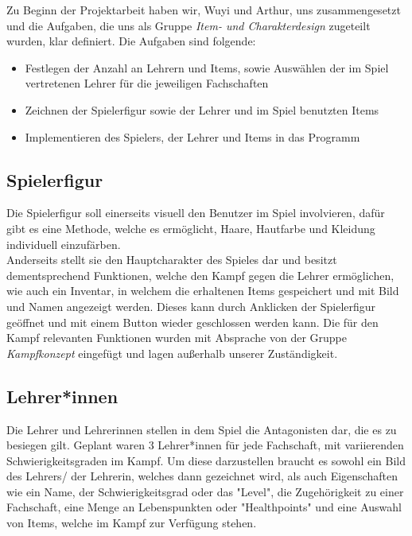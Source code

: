 Zu Beginn der Projektarbeit haben wir, Wuyi und Arthur, uns zusammengesetzt und die Aufgaben, die uns als Gruppe \emph{Item- und Charakterdesign} zugeteilt wurden, klar definiert. Die Aufgaben sind folgende:

\begin{itemize}
	\item Festlegen der Anzahl an Lehrern und Items, sowie Auswählen der im Spiel vertretenen Lehrer für die jeweiligen Fachschaften
	\item Zeichnen der Spielerfigur sowie der Lehrer und im Spiel benutzten Items
	\item Implementieren des Spielers, der Lehrer und Items in das Programm 
\end{itemize}

\subsection{Spielerfigur}
Die Spielerfigur soll einerseits visuell den Benutzer im Spiel involvieren, dafür gibt es eine Methode, welche es ermöglicht, Haare, Hautfarbe und Kleidung individuell einzufärben.\\ Anderseits stellt sie den Hauptcharakter des Spieles dar und besitzt dementsprechend Funktionen, welche den Kampf gegen die Lehrer ermöglichen, wie auch ein Inventar, in welchem die erhaltenen Items gespeichert und mit Bild und Namen angezeigt werden. Dieses kann durch Anklicken der Spielerfigur geöffnet und mit einem Button wieder geschlossen werden kann. Die für den Kampf relevanten Funktionen wurden mit Absprache von der Gruppe \emph{Kampfkonzept} eingefügt und lagen außerhalb unserer Zuständigkeit.\\

\subsection{Lehrer*innen}
Die Lehrer und Lehrerinnen stellen in dem Spiel die Antagonisten dar, die es zu besiegen gilt. Geplant waren 3 Lehrer*innen für jede Fachschaft, mit variierenden Schwierigkeitsgraden im Kampf. Um diese darzustellen braucht es sowohl ein Bild des Lehrers/ der Lehrerin, welches dann gezeichnet wird, als auch Eigenschaften wie ein Name, der Schwierigkeitsgrad oder das "Level", die Zugehörigkeit zu einer Fachschaft, eine Menge an Lebenspunkten oder "Healthpoints" und eine Auswahl von Items, welche im Kampf zur Verfügung stehen.

